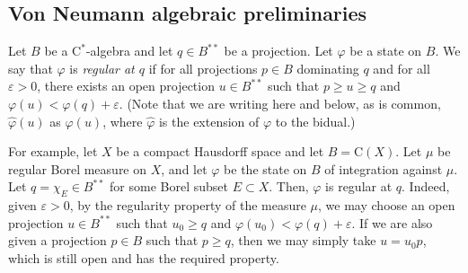 \documentclass[10pt]{amsart}
\newcommand{\rC}{\mathrm{C}}
\newcommand{\eps}{\varepsilon}
\renewcommand{\phi}{\varphi}
\theoremstyle{definition}
\begin{document}
\subsection{Von Neumann algebraic preliminaries}




Let $B$ be a
 $\rC^*$-algebra and let $q\in B^{**}$ be a projection. Let $\phi$ be a state on $B$.
We say that $\phi$ is \emph{regular at $q$} if  for all projections $p\in B$ dominating $q$ and for all $\eps > 0$, there exists an open projection $u\in B^{**}$ such that $p \geq u\geq q$ and $\phi(u) < \phi(q) + \eps$.
(Note that we are writing here and below, as is common, $\hat{\phi}(u)$ as $\phi(u)$, where 
$\hat{\phi}$ is the extension of $\phi$ to the bidual.)


For example, let $X$ be a compact Hausdorff space and let $B=\rC(X)$. Let $\mu$ be regular Borel measure on $X$, and let $\phi$ be the state on $B$ of integration against $\mu$. Let $q=\chi_E\in B^{**}$ for some Borel subset $E\subset X$. Then, $\phi$ is regular at $q$. Indeed, given $\eps>0$, by the regularity property of the measure $\mu$, we may choose an open projection $u\in B^{**}$ such that $u_0\geq q$ and $\phi(u_0)<\phi(q)+\eps$. If we are also given a projection $p\in B$ such that $p\geq q$, then we may simply take $u=u_0p$, which is still open and has the required property.
\end{document}
